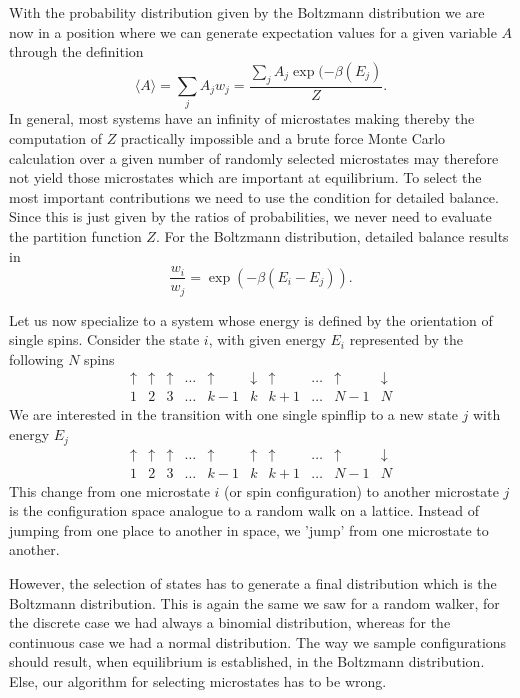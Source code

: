 With the probability distribution given by the Boltzmann distribution we are now in a position
where we can generate expectation values for a given variable $A$ through the
definition
\[
   \langle A \rangle = \sum_jA_jw_j=
    \frac{\sum_jA_j\exp{(-\beta(E_j)}}{Z}.
\]
In general, most systems have an infinity of microstates making thereby the computation
of $Z$ practically impossible and 
a brute force Monte Carlo calculation over a given number of randomly selected microstates
may therefore not yield those microstates which are important 
at equilibrium. 
To select the most important contributions we need to  
use the condition for detailed balance. Since this is just given by the ratios of probabilities,
we never need to evaluate the partition function $Z$.
For the 
Boltzmann distribution, detailed balance results in
       \[ \frac{w_i}{w_j}= \exp{(-\beta(E_i-E_j))}. \]

Let us now specialize to a system whose energy is defined by the orientation of single spins.
Consider the state $i$, with given energy $E_i$ represented by the following $N$ spins
\[
\begin{array}{cccccccccc}
\uparrow&\uparrow&\uparrow&\dots&\uparrow&\downarrow&\uparrow&\dots&\uparrow&\downarrow\\
1&2&3&\dots& k-1&k&k+1&\dots&N-1&N\end{array}
\]
We are interested in the transition with one single  spinflip to a new state $j$ with energy $E_j$
\[
\begin{array}{cccccccccc}
\uparrow&\uparrow&\uparrow&\dots&\uparrow&\uparrow&\uparrow&\dots&\uparrow&\downarrow\\
1&2&3&\dots& k-1&k&k+1&\dots&N-1&N\end{array}
\]
This change from one microstate $i$ (or spin configuration)  to another microstate $j$ is the
configuration space analogue to a random walk on a lattice. Instead of jumping from 
one place to another in space, we 'jump' from one microstate to another.

However, the selection of states has to generate a final distribution which is the
Boltzmann distribution. This is again the same we saw for a random walker, for the discrete case we had 
always a binomial distribution, whereas for the continuous case we had a normal distribution.
The way we sample configurations should result, when equilibrium is established, in the 
Boltzmann distribution. Else, our algorithm for selecting microstates has to be wrong.
 
